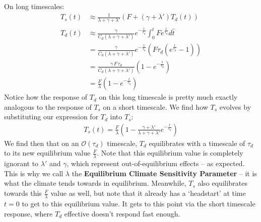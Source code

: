 On long timescales:
\begin{align*}
    T_s(t) & \approx \frac{1}{\lambda+\gamma+\lambda'}\left(F+(\gamma+\lambda ')T_d(t)\right) \\ 
    T_d(t) & \approx \frac{\gamma}{C_d(\lambda+\gamma+\lambda')}e^{-\frac{t}{\tau_d}}\int_0^t F e^{\frac{\hat{t}}{\tau_d}}d\hat{t}
    \\
    &=\frac{\gamma}{C_d(\lambda+\gamma+\lambda')}e^{-\frac{t}{\tau_d}}\left( F\tau_d \left( e^{\frac{t}{\tau_d}}-1 \right) \right)
    \\
    &=\frac{\gamma\,F\,\tau_d}{C_d(\lambda+\gamma+\lambda')}\left( 1-e^{-\frac{t}{\tau_d}} \right)
    \\
    &=\frac{F}{\lambda}\left( 1-e^{-\frac{t}{\tau_d}} \right)
\end{align*}
Notice how the response of $T_d$ on this long timescale is pretty much exactly analogous to the response of $T_s$ on a short timescale. We find how $T_s$ evolves by substituting our expression for $T_d$ into $T_s$:
\begin{align*}
    T_s(t)=\frac{F}{\lambda}\left( 1 - \frac{\gamma+\lambda'}{\lambda+\gamma+\lambda'}e^{-\frac{t}{\tau_d}}
     \right)
\end{align*}
We find then that on an $\mathcal{O}(\tau_d)$ timescale, $T_d$ equilibrates with a timescale of $\tau_d$ to its new equilibrium value $\frac{F}{\lambda}$. Note that this equilibrium value is completely ignorant to $\lambda'$ and $\gamma$, which represent out-of-equilibrium effects – as expected. This is why we call $\lambda$ the \textbf{Equilibrium Climate Sensitivity Parameter} – it is what the climate tends towards in equilibrium. Meanwhile, $T_s$ also equilibrates towards this $\frac{F}{\lambda}$ value as well, but note that it already has a `headstart' at time $t=0$ to get to this equilibrium value. It gets to this point via the short timescale response, where $T_d$ effective doesn't respond fast enough.

